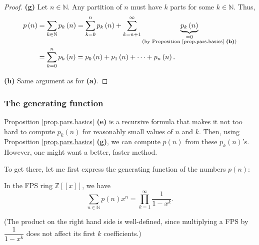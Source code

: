 \begin{proof}
\textbf{(g)} Let $n\in\mathbb{N}$. Any partition of $n$ must have $k$ parts
for some $k\in\mathbb{N}$. Thus,%
\begin{align*}
p\left(  n\right)   &  =\sum_{k\in\mathbb{N}}p_{k}\left(  n\right)
=\sum_{k=0}^{n}p_{k}\left(  n\right)  +\sum_{k=n+1}^{\infty}\underbrace{p_{k}%
\left(  n\right)  }_{\substack{=0\\\text{(by Proposition
\ref{prop.pars.basics} \textbf{(b)})}}}\\
&  =\sum_{k=0}^{n}p_{k}\left(  n\right)  =p_{0}\left(  n\right)  +p_{1}\left(
n\right)  +\cdots+p_{n}\left(  n\right)  .
\end{align*}


\textbf{(h)} Same argument as for \textbf{(a)}.
\end{proof}

\subsubsection{The generating function}

Proposition \ref{prop.pars.basics} \textbf{(e)} is a recursive formula that
makes it not too hard to compute $p_{k}\left(  n\right)  $ for reasonably
small values of $n$ and $k$. Then, using Proposition \ref{prop.pars.basics}
\textbf{(g)}, we can compute $p\left(  n\right)  $ from these $p_{k}\left(
n\right)  $'s. However, one might want a better, faster method.

To get there, let me first express the generating function of the numbers
$p\left(  n\right)  $:

\begin{theorem}
\label{thm.pars.main-gf}In the FPS ring $\mathbb{Z}\left[  \left[  x\right]
\right]  $, we have%
\[
\sum_{n\in\mathbb{N}}p\left(  n\right)  x^{n}=\prod_{k=1}^{\infty}\dfrac
{1}{1-x^{k}}.
\]


(The product on the right hand side is well-defined, since multiplying a FPS
by $\dfrac{1}{1-x^{k}}$ does not affect its first $k$ coefficients.)
\end{theorem}

